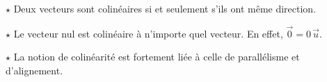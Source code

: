 \documentclass[border=4pt]{standalone}
\begin{document}
\begin{minipage}{16cm}\large \colorbox{orange!8}{\begin{minipage}{15.5cm}\par $\star$ Deux vecteurs sont colinéaires si et seulement s'ils ont {\color{orange}même direction}.\par $\star$ Le vecteur nul est colinéaire à n'importe quel vecteur. En effet, $\vec{0}=0\,\vec{u}$.\par $\star$ La notion de colinéarité est fortement liée à celle de parallélisme et d'alignement.\vspace{4pt}\end{minipage}}\end{minipage}
\end{document}
